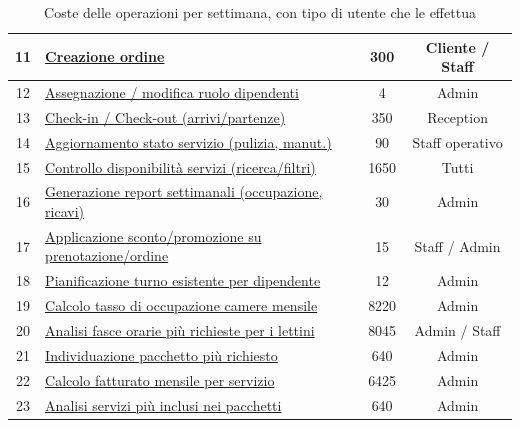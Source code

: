 \documentclass[a4paper,12pt]{report}
\begin{document}
\begin{table}[H]
\begin{tabularx}{\textwidth}{|c|>{\raggedright\arraybackslash}X|c|c|}
		\hline
		11          & \hyperref[op11]{Creazione ordine}                                      & 300                       & Cliente / Staff        \\
		\hline
		12          & \hyperref[op12]{Assegnazione / modifica ruolo dipendenti}              & 4                         & Admin                  \\
		\hline
		13          & \hyperref[op13]{Check-in / Check-out (arrivi/partenze)}                & 350                       & Reception              \\
		\hline
		14          & \hyperref[op14]{Aggiornamento stato servizio (pulizia, manut.)}        & 90                        & Staff operativo        \\
		\hline
		15          & \hyperref[op15]{Controllo disponibilità servizi (ricerca/filtri)}      & 1650                      & Tutti                  \\
		\hline
		16          & \hyperref[op16]{Generazione report settimanali (occupazione, ricavi)}  & 30                        & Admin                  \\
		\hline
		17          & \hyperref[op17]{Applicazione sconto/promozione su prenotazione/ordine} & 15                        & Staff / Admin          \\
		\hline
		18          & \hyperref[op18]{Pianificazione turno esistente per dipendente}         & 12                        & Admin                  \\
		\hline
		19          & \hyperref[op19]{Calcolo tasso di occupazione camere mensile}           & 8220                      & Admin                  \\
		\hline
		20          & \hyperref[op20]{Analisi fasce orarie più richieste per i lettini}      & 8045                      & Admin / Staff          \\
		\hline
		21          & \hyperref[op21]{Individuazione pacchetto più richiesto}                & 640                       & Admin                  \\
		\hline
		22          & \hyperref[op22]{Calcolo fatturato mensile per servizio}                & 6425                      & Admin                  \\
		\hline
		23          & \hyperref[op23]{Analisi servizi più inclusi nei pacchetti}             & 640                       & Admin                  \\
		\hline
	\end{tabularx}
	\caption{Coste delle operazioni per settimana, con tipo di utente che le effettua}
	\label{tab:costo-operazioni-settimanali}
\end{table}
\end{document}

